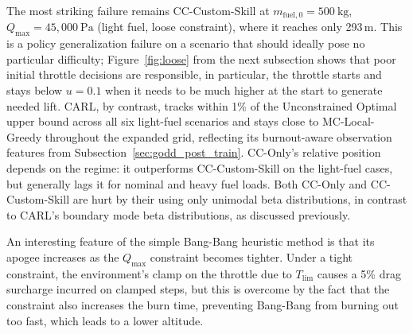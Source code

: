 \documentclass[mnsc,sglanonrev]{informs4}
\begin{document}


The most striking failure remains CC-Custom-Skill at $m_{\mathrm{fuel},0}=500\ \mathrm{kg}$, $Q_{\max}=45{,}000\ \mathrm{Pa}$ (light fuel, loose constraint), where it reaches only 293\,m. This is a policy generalization failure on a scenario that should ideally pose no particular difficulty; Figure~\ref{fig:loose} from the next subsection shows that poor initial throttle decisions are responsible, in particular, the throttle starts and stays below $u=0.1$ when it needs to be much higher at the start to generate needed lift. CARL, by contrast, tracks within 1\% of the Unconstrained Optimal upper bound across all six light-fuel scenarios and stays close to MC-Local-Greedy throughout the expanded grid, reflecting its burnout-aware observation features  from Subsection~\ref{sec:godd_post_train}. CC-Only's relative position depends on the regime: it outperforms CC-Custom-Skill on the light-fuel cases, but generally lags it for nominal and heavy fuel loads. Both CC-Only and CC-Custom-Skill are hurt by their using only unimodal beta distributions, in contrast to CARL's boundary mode beta distributions, as discussed previously.

An interesting feature of the simple Bang-Bang heuristic method is that its apogee increases as the $Q_{\max}$ constraint becomes tighter. Under a tight constraint, the environment's clamp on the throttle due to $T_{\lim}$ causes a 5\% drag surcharge incurred on clamped steps, but this is overcome by the fact that the constraint also increases the burn time, preventing Bang-Bang from burning out too fast, which leads to a lower altitude. 
\end{document}
